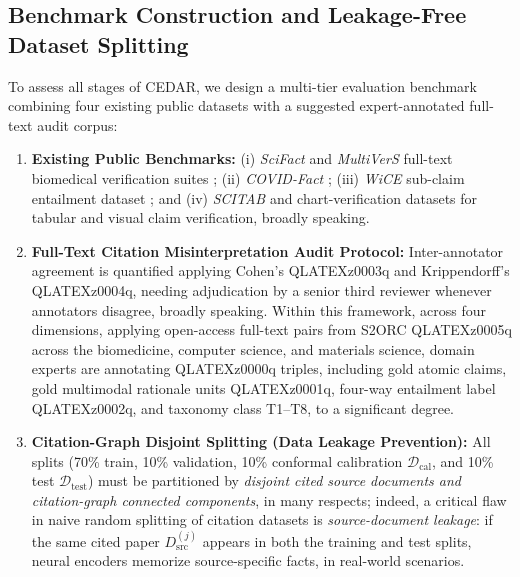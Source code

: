 \documentclass[journal]{IEEEtran}
\begin{document}
\subsection{Benchmark Construction and Leakage-Free Dataset Splitting}
To assess all stages of CEDAR, we design a multi-tier evaluation benchmark combining four existing public datasets with a suggested expert-annotated full-text audit corpus:
\begin{enumerate}
\item \textbf{Existing Public Benchmarks:} (i) \emph{SciFact} \cite{wadden2020fact} and \emph{MultiVerS} full-text biomedical verification suites \cite{wadden2022multivers}; (ii) \emph{COVID-Fact} \cite{saakyan2021covidfact}; (iii) \emph{WiCE} sub-claim entailment dataset \cite{kamoi2023wice}; and (iv) \emph{SCITAB} \cite{lu2023scitab} and chart-verification datasets \cite{akhtar2023reading} for tabular and visual claim verification, broadly speaking.
\item \textbf{Full-Text Citation Misinterpretation Audit Protocol:} Inter-annotator agreement is quantified applying Cohen's QLATEXz0003q and Krippendorff's QLATEXz0004q, needing adjudication by a senior third reviewer whenever annotators disagree, broadly speaking. Within this framework, across four dimensions, applying open-access full-text pairs from S2ORC QLATEXz0005q across the biomedicine, computer science, and materials science, domain experts are annotating QLATEXz0000q triples, including gold atomic claims, gold multimodal rationale units QLATEXz0001q, four-way entailment label QLATEXz0002q, and taxonomy class T1--T8, to a significant degree.
\item \textbf{Citation-Graph Disjoint Splitting (Data Leakage Prevention):} All splits (70\% train, 10\% validation, 10\% conformal calibration $\mathcal{D}_{\text{cal}}$, and 10\% test $\mathcal{D}_{\text{test}}$) must be partitioned by \emph{disjoint cited source documents and citation-graph connected components}, in many respects; indeed, a critical flaw in naive random splitting of citation datasets is \emph{source-document leakage}: if the same cited paper $D_{\text{src}}^{(j)}$ appears in both the training and test splits, neural encoders memorize source-specific facts, in real-world scenarios.
\end{enumerate}
\end{document}
